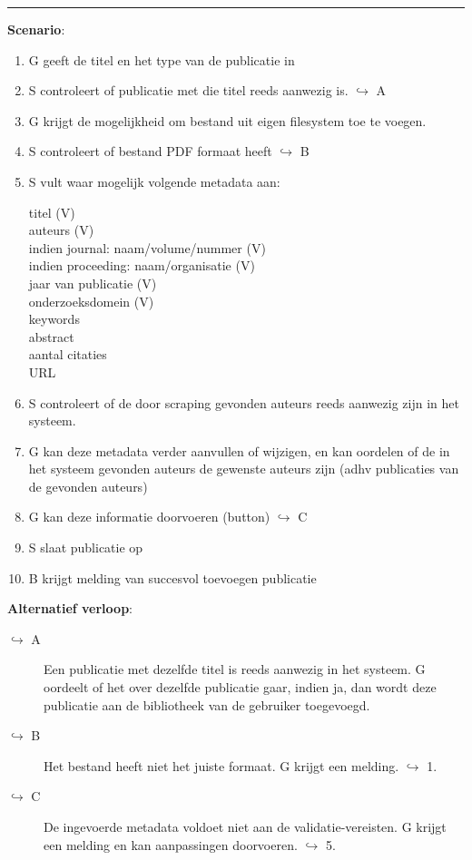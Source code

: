 \hrule
\vspace{2 mm}
\noindent \textbf{Scenario}:
\begin{enumerate}
\item G geeft de titel en het type van de publicatie in 
\item S controleert of publicatie met die titel reeds aanwezig is.  $\hookrightarrow$ A
\item G krijgt de mogelijkheid om bestand uit eigen filesystem toe te voegen.
\item S controleert of bestand PDF formaat heeft $\hookrightarrow$ B
\item S vult waar mogelijk volgende metadata aan:
\begin{description}
  \item[titel (V)]  \hfill 
  \item[auteurs (V) ] \hfill 
  \item[indien journal: naam/volume/nummer (V)] \hfill 
  \item[indien proceeding: naam/organisatie (V)] \hfill 
  \item[jaar van publicatie (V) ] \hfill 
  \item[onderzoeksdomein (V)]  \hfill 
  \item[keywords]  \hfill 
  \item[abstract] \hfill 
   \item[aantal citaties] \hfill 
    \item[URL] \hfill 
  \end{description}
\item S controleert of de door scraping gevonden auteurs reeds aanwezig zijn in het systeem. 
\item G kan deze metadata verder aanvullen of wijzigen, en kan oordelen of de in het systeem gevonden auteurs de gewenste auteurs zijn (adhv publicaties van de gevonden auteurs) 
 \item G kan deze informatie doorvoeren (button)  $\hookrightarrow$ C
 \item S slaat publicatie op   
 \item B krijgt melding van succesvol toevoegen publicatie 
\end{enumerate}
\noindent \textbf{Alternatief verloop}:
\begin{description}
\item[ $\hookrightarrow$ A] Een publicatie met dezelfde titel is reeds aanwezig in het systeem. G oordeelt of het over dezelfde publicatie gaar, indien ja, dan wordt deze publicatie aan de bibliotheek van de gebruiker toegevoegd. 
\item[ $\hookrightarrow$ B] Het bestand heeft niet het juiste formaat. G krijgt een melding. $\hookrightarrow$ 1.
\item[ $\hookrightarrow$ C] De ingevoerde metadata voldoet niet aan de validatie-vereisten. G krijgt een melding en kan aanpassingen doorvoeren. $\hookrightarrow$ 5.
\end{description}

